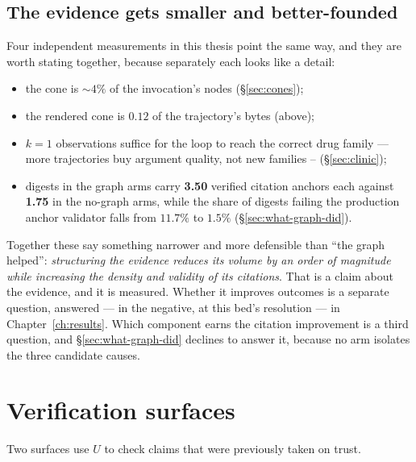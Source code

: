 \subsection*{The evidence gets smaller and better-founded}

Four independent measurements in this thesis point the same way, and they
are worth stating together, because separately each looks like a detail:

\begin{itemize}
  \item the cone is $\sim$$4\%$ of the invocation's nodes
        (\S\ref{sec:cones});
  \item the rendered cone is $0.12$ of the trajectory's bytes (above);
  \item $k{=}1$ observations suffice for the loop to reach the correct drug
        family --- more trajectories buy argument quality, not new families
        -- (\S\ref{sec:clinic});
  \item digests in the graph arms carry \textbf{3.50} verified citation
        anchors each against \textbf{1.75} in the no-graph arms, while the
        share of digests failing the production anchor validator falls
        from $11.7\%$ to $1.5\%$  (\S\ref{sec:what-graph-did}).
\end{itemize}

Together these say something narrower and more defensible than ``the graph
helped'': \emph{structuring the evidence reduces its volume by an order of
magnitude while increasing the density and validity of its citations}. That
is a claim about the evidence, and it is measured. Whether it improves
outcomes is a separate question, answered --- in the negative, at this
bed's resolution --- in Chapter~\ref{ch:results}. Which component earns the
citation improvement is a third question, and \S\ref{sec:what-graph-did}
declines to answer it, because no arm isolates the three candidate causes.

\section{Verification surfaces}
\label{sec:verification}

Two surfaces use $U$ to check claims that were previously taken on trust.

